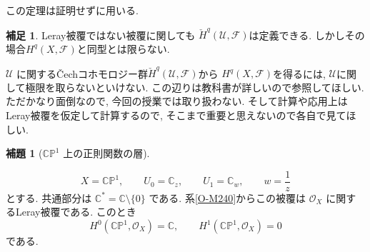 \documentclass[dvipdfmx,a4paper,11pt]{article} %
\newcommand{\C}{\mathbb{C}}
\theoremstyle{definition}
\numberwithin{equation}{section}
\newtheorem{lem}[thm]{補題}
\newtheorem{rem}[thm]{補足}
\begin{document}
この定理は証明せずに用いる.
\begin{rem}
Leray被覆ではない被覆に関しても
$\check H^q(\mathcal U,\mathcal F)$は定義できる. 
しかしその場合$H^q(X,\mathcal F)$と同型とは限らない. 

$\mathcal U$ に関する\v{C}echコホモロジー群$\check H^q(\mathcal U,\mathcal F)$から
$H^q(X,\mathcal F)$を得るには, $\mathcal U$に関して極限を取らないといけない. 
この辺りは教科書が詳しいので参照してほしい. ただかなり面倒なので, 今回の授業では取り扱わない. 
そして計算や応用上はLeray被覆を仮定して計算するので, そこまで重要と思えないので各自で見てほしい. 
\end{rem}


\begin{lem}[$\C\mathbb P^1$ 上の正則関数の層]
\label{exa-cohomology-sphere}

\[
X=\C\mathbb P^1,\qquad
U_0=\C_z,\qquad U_1=\C_w,\qquad w=\frac1z
\]
とする.
共通部分は $\C^*=\C\setminus\{0\}$ である.
系\ref{O-M240}からこの被覆は $\mathcal O_X$ に関するLeray被覆である. 
このとき
\[
H^0(\C\mathbb P^1,\mathcal O_X)=\C,\qquad
H^1(\C\mathbb P^1,\mathcal O_X)=0
\]
である.
\end{lem}
\end{document}
